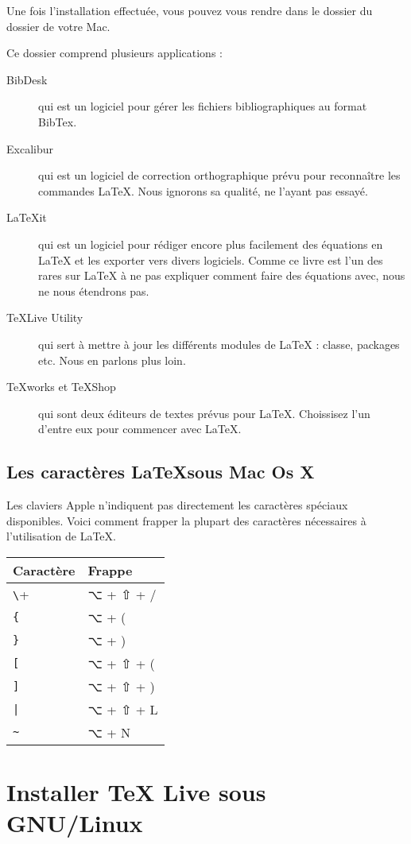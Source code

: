 Une fois l'installation effectuée, vous pouvez vous rendre dans le dossier  du dossier  de votre Mac.

Ce dossier comprend plusieurs applications :
\begin{description}
\item[BibDesk] qui est un logiciel pour gérer les fichiers bibliographiques au format BibTex.
\item[Excalibur] qui est un logiciel de correction orthographique prévu pour reconnaître les commandes \LaTeX{}. Nous ignorons sa qualité, ne l'ayant pas essayé.
\item[LaTeXit] qui est un logiciel pour rédiger encore plus facilement des équations en \LaTeX{} et les exporter vers divers logiciels. Comme ce livre est l'un des rares sur \LaTeX{} à ne pas expliquer comment faire des équations avec, nous ne nous étendrons pas.
\item[TeXLive Utility] qui sert à mettre à jour les différents modules de \LaTeX{} : classe, packages etc. Nous en parlons plus loin. 
\item[TeXworks et TeXShop] qui sont deux éditeurs de textes prévus pour \LaTeX. Choissisez l'un d'entre eux pour commencer avec \LaTeX{}.
\end{description}

\subsection{Les caractères \LaTeX sous Mac Os X}\label{claviermac}

Les claviers Apple n'indiquent pas directement les caractères spéciaux disponibles. Voici comment frapper la plupart des caractères nécessaires à l'utilisation de \LaTeX.

\begin{longtable}{|ll|}
\hline
Caractère & Frappe \\
\hline
\endhead
\hline
\endfoot
\verb+\+ & ⌥ + ⇧ + / \\
\verb+{+ & ⌥ + (\\
\verb+}+ & ⌥ + )\\
\verb+[+ & ⌥ + ⇧ + ( \\
\verb+]+ & ⌥ + ⇧ + ) \\
\verb+|+ & ⌥ + ⇧ + L  \\
\verb+~+ & ⌥ + N  \\
\end{longtable}
\section{Installer TeX Live sous GNU/Linux}

